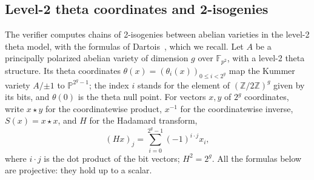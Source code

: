 \documentclass[version=preprint]{iacrcc}
\begin{document}
    \subsection{Level-2 theta coordinates and 2-isogenies}
    \label{sec:theta}
    The verifier computes chains of 2-isogenies between abelian varieties in
    the level-2 theta model, with the formulas of Dartois~\cite{Dar24}, which we
    recall. Let $A$ be a principally polarized abelian variety of dimension $g$
    over $\mathbb{F}_{p^2}$, with a level-2 theta structure. Its theta
    coordinates $\theta(x) = (\theta_i(x))_{0 \le i < 2^g}$ map the Kummer
    variety $A/{\pm 1}$ to $\mathbb{P}^{2^g - 1}$; the index $i$ stands for the
    element of $(\mathbb{Z}/2\mathbb{Z})^g$ given by its bits, and $\theta(0)$ is
    the theta null point. For vectors $x, y$ of $2^g$ coordinates, write $x
    \star y$ for the coordinatewise product, $x^{-1}$ for the coordinatewise
    inverse, $S(x) = x \star x$, and $H$ for the Hadamard transform,
    \[
    (H x)_j = \sum_{i=0}^{2^g - 1} (-1)^{i \cdot j} x_i ,
    \]
    where $i \cdot j$ is the dot product of the bit vectors; $H^2 = 2^g$. All
    the formulas below are projective: they hold up to a scalar.
\end{document}
